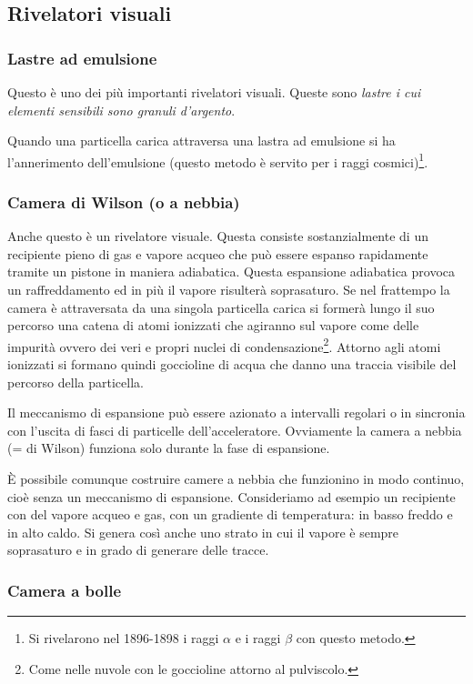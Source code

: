 \subsection{Rivelatori visuali}
\subsubsection{Lastre ad emulsione}
Questo è uno dei più importanti rivelatori visuali. Queste sono \textit{lastre i cui elementi sensibili sono granuli d'argento}.

Quando una particella carica attraversa una lastra ad emulsione si ha l'annerimento dell'emulsione (questo metodo è servito per i raggi cosmici)\footnote{Si rivelarono nel 1896-1898 i raggi $\alpha$ e i raggi $\beta$ con questo metodo.}.
\subsubsection{Camera di Wilson (o a nebbia)}

Anche questo è un rivelatore visuale. Questa consiste sostanzialmente di un recipiente pieno di gas e vapore acqueo che può essere espanso rapidamente tramite un pistone in maniera adiabatica. Questa espansione adiabatica provoca un raffreddamento ed in più il vapore risulterà soprasaturo. Se nel frattempo la camera è attraversata da una singola particella carica si formerà lungo il suo percorso una catena di atomi ionizzati che agiranno sul vapore come delle impurità ovvero dei veri e propri nuclei di condensazione\footnote{Come nelle nuvole con le goccioline attorno al pulviscolo. }. Attorno agli atomi ionizzati si formano quindi goccioline di acqua che danno una traccia visibile del percorso della particella.

Il meccanismo di espansione può essere azionato a intervalli regolari o in sincronia con l'uscita di fasci di particelle dell'acceleratore. Ovviamente la camera a nebbia (= di Wilson) funziona solo durante la fase di espansione.

\`E possibile comunque costruire camere a nebbia che funzionino in modo continuo, cioè senza un meccanismo di espansione. Consideriamo ad esempio un recipiente con del vapore acqueo e gas, con un gradiente di temperatura: in basso freddo e in alto caldo. Si genera così anche uno strato in cui il vapore è sempre soprasaturo e in grado di generare delle tracce.

\subsubsection{Camera a bolle}

